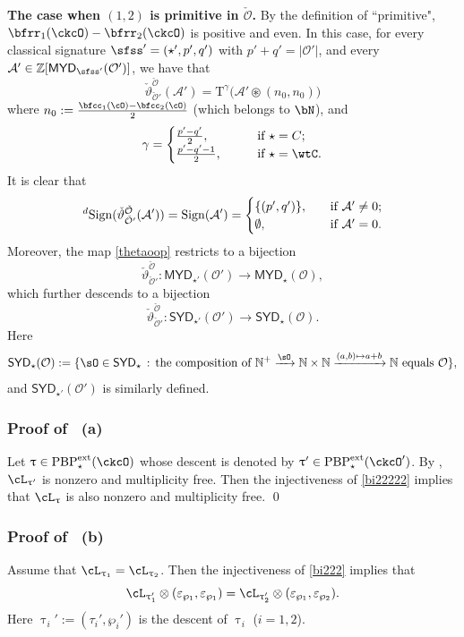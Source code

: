 \documentclass[11pt,a4paper]{amsart}
\def\SYD{{\mathsf{SYD}}}
\def\MYD{{\mathsf{MYD}}}
\def\abs#1{\left|{#1}\right|}
\newcommand{\BN}{{\mathbb {N}}}
\newcommand{\CA}{{\mathcal {A}}}
\newcommand{\CO}{{\mathcal {O}}}
\newcommand{\Z}{\mathbb{Z}}
\newcommand{\be}{\begin {equation}}
\newcommand{\ee}{\end {equation}}
\numberwithin{equation}{section}
\theoremstyle{remark}
\def\PBPes{\mathrm{PBP}^{\mathrm{ext}}_{\star}}
\def\maltese{\mathrm{T}}
\def\SYD{{\mathsf{SYD}}}
\def\MYD{{\mathsf{MYD}}}
\def\ac{\cL}
\begin{document}
 {\bf The case when $(1,2)$ is primitive in $\check \CO$.}
 By the definition of ``primitive", $\bfrr_{1}(\ckcO)-\bfrr_{2}(\ckcO)$ is  positive and even.  In this case, for every classical signature $\sfss'=(\star', p',q')$ with $p'+q'=\abs{\CO'}$, and every  $\CA'\in \Z[\MYD_{\sfss'}(\CO')]$, we have that
 \be\label{tlcc1}
 \check{\vartheta}_{\check \CO'}^{\check \CO}(\CA')=\maltese^{\gamma}\big( \CA'
      \circledast (n_{0},n_{0})\big)
  \ee
where $n_0:=\frac{\bfcc_{1}(\cO)-\bfcc_{2}(\cO)}{2}$ (which belongs to $\bN$), and  %
   \be\label{y}
   \gamma=\begin{cases}
   \frac{p'-q'}{2}, \qquad & \textrm{if $\star=C$};\\
    \frac{p'-q'-1}{2}, \qquad &\textrm{if $\star=\wtC$}.
   \end{cases}
    \ee
 It is clear that
 \be\label{dsign1}
 \dsign(\check{\vartheta}_{\check \CO'}^{\check \CO}(\CA'))=\sign{\CA'}=
 \begin{cases}
   \{(p',q')\},\quad & \textrm{if $\CA'\neq 0$};\\
   \emptyset, \quad & \textrm{if $\CA'=0$}.
 \end{cases}
 \ee
    Moreover, the map \eqref{thetaoop}  restricts to a bijection
    \be\label{bi222}
    \check{\vartheta}_{\check \CO'}^{\check \CO}  :  \MYD_{\star'}(\CO')\rightarrow \MYD_{\star}(\CO),
    \ee
which further descends to a bijection
    \be\label{bi22222}
    \check{\vartheta}_{\check \CO'}^{\check \CO}  :  \SYD_{\star'}(\CO')\rightarrow \SYD_{\star}(\CO).
    \ee
    Here
    \[
    \SYD_{\star}(\CO):=
    \{\sO\in \SYD_{\star}\,:\,\textrm{the composition of $\BN^+\xrightarrow{\sO}\BN\times \BN\xrightarrow{(a,b)\mapsto a+b}\BN$ equals $\CO$}\},
    \]
    and $\SYD_{\star'}(\CO')$ is similarly defined.

\subsubsection*{Proof of ~(a)} Let $\uptau\in \PBPes(\ckcO)$ whose descent is denoted by $\uptau'\in \PBPes(\ckcO')$. By , $\ac_{\uptau'}$ is nonzero  and
 multiplicity free. Then the injectiveness of \eqref{bi22222} implies that $\ac_{\uptau}$ is also nonzero  and  multiplicity free.
 \qed

\smallskip

\subsubsection*{Proof of ~(b)} Assume
that $\ac_{\uptau_{1}}=\ac_{\uptau_{2}}$. Then the injectiveness of \eqref{bi222} implies that
\[\ac_{\uptau'_{1}}\otimes
(\varepsilon_{\wp_{1}},\varepsilon_{\wp_{1}})=\ac_{\uptau'_{2}}\otimes
(\varepsilon_{\wp_{1}}, \varepsilon_{\wp_{2}}).
\]
Here $\uptau_i':=(\tau_i',\wp_i')$ is the descent of $\uptau_i$ ($i=1,2$).
\end{document}
